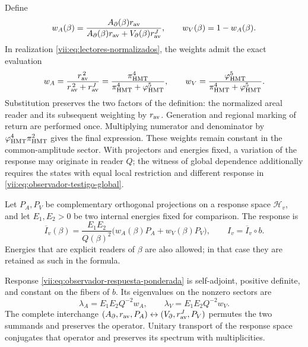 Define
\[
 w_A(\beta)=
 \frac{A_\partial(\beta)r_{\rm av}}
 {A_\partial(\beta)r_{\rm av}+V_\partial(\beta)r_{\rm av}^{J}},
 \qquad w_V(\beta)=1-w_A(\beta).
\]
In realization \eqref{vii:eq:lectores-normalizados}, the weights
admit the exact evaluation
\begin{equation}
 w_A=\frac{r_{\rm av}^{\,2}}{r_{\rm av}^{\,2}+r_{\rm av}^{J}}
     =\frac{\pi_{\rm HMT}^{4}}
            {\pi_{\rm HMT}^{4}+\varphi_{\rm HMT}^{5}},\qquad
 w_V=\frac{\varphi_{\rm HMT}^{5}}
            {\pi_{\rm HMT}^{4}+\varphi_{\rm HMT}^{5}}.
 \label{vii:eq:pesos-amplitud-comun}
\end{equation}
Substitution preserves the two factors of the definition: the normalized
areal reader and its subsequent weighting by \(r_{\rm av}\).
Generation and regional marking of return are performed once.
Multiplying numerator
and denominator by \(\varphi_{\rm HMT}^4\pi_{\rm HMT}^2\)
gives the final expression. These weights remain constant in the
common-amplitude sector. With projectors and energies fixed, a
variation of the response may originate in reader \(Q\);
the witness of global dependence additionally requires the states with
equal local restriction and different response in
\eqref{vii:eq:observador-testigo-global}.


Let \(P_A,P_V\) be complementary orthogonal projections on a
response space \(\mathcal H_v\), and let \(E_1,E_2>0\)
be two internal energies fixed for comparison. The response is
\begin{equation}
 \overline I_v(\beta)=\frac{E_1E_2}{Q(\beta)^2}
       \bigl(w_A(\beta)P_A+w_V(\beta)P_V\bigr),
 \qquad I_v=\overline I_v\circ b.
 \label{vii:eq:observador-respuesta-ponderada}
\end{equation}
Energies that are explicit readers of
\(\beta\) are also allowed; in that case they are retained as such in the formula.

\begin{proposition}
\label{vii:prop:observador-respuesta-positiva}
Response \eqref{vii:eq:observador-respuesta-ponderada} is
self-adjoint, positive definite, and constant on the fibers of \(b\).
Its eigenvalues on the nonzero sectors are
\[
 \lambda_A=E_1E_2Q^{-2}w_A,\qquad
 \lambda_V=E_1E_2Q^{-2}w_V.
\]
The complete interchange
\((A_\partial,r_{\rm av},P_A)
 \leftrightarrow(V_\partial,r_{\rm av}^{J},P_V)\)
permutes the two summands and preserves the operator. Unitary transport
of the response space conjugates that operator and preserves
its spectrum with multiplicities.
\end{proposition}

